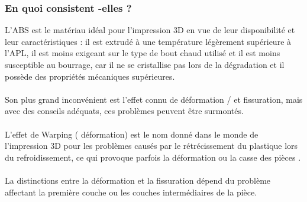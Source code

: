 \documentclass[11pt,a4paper]{article}
\begin{document}
		\subsubsection{En quoi consistent -elles ?}L’ABS est le matériau idéal pour l’impression 3D en vue de leur disponibilité et leur caractéristiques : il est extrudé à une température légèrement supérieure à l’APL, il est moins exigeant sur le type de bout chaud utilisé et il est moins susceptible au bourrage, car il ne se cristallise pas lors de la dégradation et il possède des propriétés mécaniques supérieures.
\\\\
Son plus grand inconvénient est l’effet connu de déformation / et fissuration, mais avec des conseils adéquats, ces problèmes peuvent être surmontés.
\\\\
L’effet de Warping ( déformation) est le nom donné dans le monde de l’impression 3D pour les problèmes causés par le rétrécissement du plastique lors du refroidissement, ce qui provoque parfois la déformation ou la casse des pièces .
\\\\
La distinctions entre la déformation et la fissuration dépend du problème affectant la première couche ou les couches intermédiaires de la pièce.
\end{document}
